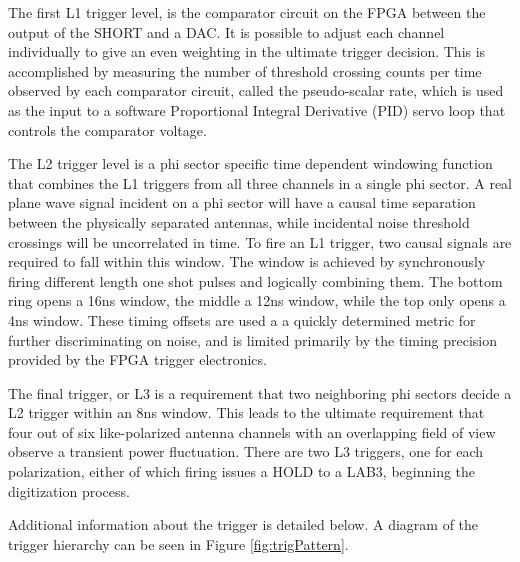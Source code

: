 		The first L1 trigger level, is the comparator circuit on the FPGA between the output of the SHORT and a DAC. It is possible to adjust each channel individually to give an even weighting in the ultimate trigger decision.  This is accomplished by measuring the number of threshold crossing counts per time observed by each comparator circuit, called the pseudo-scalar rate, which is used as the input to a software Proportional Integral Derivative (PID) servo loop that controls the comparator voltage.
		
		The L2 trigger level is a phi sector specific time dependent windowing function that combines the L1 triggers from all three channels in a single phi sector.  A real plane wave signal incident on a phi sector will have a causal time separation between the physically separated antennas, while incidental noise threshold crossings will be uncorrelated in time.  To fire an L1 trigger, two causal signals are required to fall within this window.  The window is achieved by synchronously firing different length one shot pulses and logically combining them.  The bottom ring opens a 16ns window, the middle a 12ns window, while the top only opens a 4ns window. These timing offsets are used a a quickly determined metric for further discriminating on noise, and is limited primarily by the timing precision provided by the FPGA trigger electronics.  
		
		The final trigger, or L3 is a requirement that two neighboring phi sectors decide a L2 trigger within an 8ns window.  This leads to the ultimate requirement that four out of six like-polarized antenna channels with an overlapping field of view observe a transient power fluctuation.  There are two L3 triggers, one for each polarization, either of which firing issues a HOLD to a LAB3, beginning the digitization process.
		
		Additional information about the trigger is detailed below.  A diagram of the trigger hierarchy can be seen in Figure \ref{fig:trigPattern}.
		
